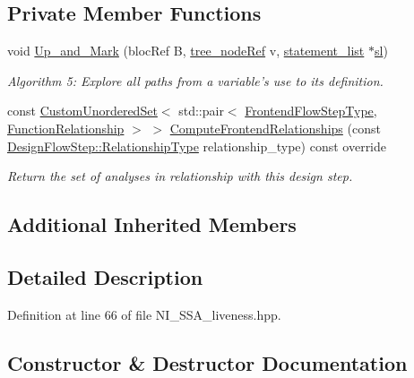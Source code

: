 \subsection*{Private Member Functions}
\begin{DoxyCompactItemize}
\item 
void \hyperlink{classNI__SSA__liveness_a4d59889b909cf697aafcfa562e93ecf8}{Up\+\_\+and\+\_\+\+Mark} (bloc\+Ref B, \hyperlink{tree__node_8hpp_a6ee377554d1c4871ad66a337eaa67fd5}{tree\+\_\+node\+Ref} v, \hyperlink{structstatement__list}{statement\+\_\+list} $\ast$\hyperlink{tutorial__pnnl__2019_2optimizations_2second_2solution_2adpcm_8c_ace9c0991f7fffe6ab436175d7fff821e}{sl})
\begin{DoxyCompactList}\small\item\em Algorithm 5\+: Explore all paths from a variable’s use to its definition. \end{DoxyCompactList}\item 
const \hyperlink{classCustomUnorderedSet}{Custom\+Unordered\+Set}$<$ std\+::pair$<$ \hyperlink{frontend__flow__step_8hpp_afeb3716c693d2b2e4ed3e6d04c3b63bb}{Frontend\+Flow\+Step\+Type}, \hyperlink{classFrontendFlowStep_af7cf30f2023e5b99e637dc2058289ab0}{Function\+Relationship} $>$ $>$ \hyperlink{classNI__SSA__liveness_a1e1ba9a120adf8b7c47fb56e4798f653}{Compute\+Frontend\+Relationships} (const \hyperlink{classDesignFlowStep_a723a3baf19ff2ceb77bc13e099d0b1b7}{Design\+Flow\+Step\+::\+Relationship\+Type} relationship\+\_\+type) const override
\begin{DoxyCompactList}\small\item\em Return the set of analyses in relationship with this design step. \end{DoxyCompactList}\end{DoxyCompactItemize}
\subsection*{Additional Inherited Members}


\subsection{Detailed Description}


Definition at line 66 of file N\+I\+\_\+\+S\+S\+A\+\_\+liveness.\+hpp.



\subsection{Constructor \& Destructor Documentation}
\mbox{\label{classNI__SSA__liveness_a96f6cf0c29fc5f8b666e715ab1a223b5}} 
